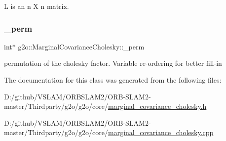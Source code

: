 L is an n X n matrix. 

\mbox{\label{classg2o_1_1_marginal_covariance_cholesky_a404f5d0ce82c2877324bafb8997b96aa}} 
\subsubsection{\texorpdfstring{\+\_\+perm}{\_perm}}
{\footnotesize\ttfamily int$\ast$ g2o\+::\+Marginal\+Covariance\+Cholesky\+::\+\_\+perm\hspace{0.3cm}{\ttfamily [protected]}}



permutation of the cholesky factor. Variable re-\/ordering for better fill-\/in 



The documentation for this class was generated from the following files\+:\begin{DoxyCompactItemize}
\item 
D\+:/github/\+V\+S\+L\+A\+M/\+O\+R\+B\+S\+L\+A\+M2/\+O\+R\+B-\/\+S\+L\+A\+M2-\/master/\+Thirdparty/g2o/g2o/core/\mbox{\hyperlink{marginal__covariance__cholesky_8h}{marginal\+\_\+covariance\+\_\+cholesky.\+h}}\item 
D\+:/github/\+V\+S\+L\+A\+M/\+O\+R\+B\+S\+L\+A\+M2/\+O\+R\+B-\/\+S\+L\+A\+M2-\/master/\+Thirdparty/g2o/g2o/core/\mbox{\hyperlink{marginal__covariance__cholesky_8cpp}{marginal\+\_\+covariance\+\_\+cholesky.\+cpp}}\end{DoxyCompactItemize}
